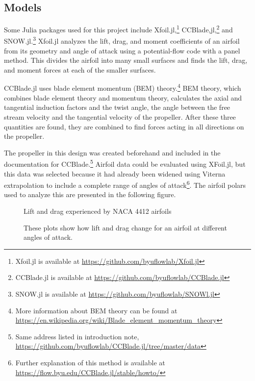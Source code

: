 \documentclass[journal ]{new-aiaa}
\begin{document}
\subsection{Models}

Some Julia packages used for this project include Xfoil.jl,\footnote{Xfoil.jl is available at \url{https://github.com/byuflowlab/Xfoil.jl}} CCBlade,jl,\footnote{CCBlade.jl is available at \url{https://github.com/byuflowlab/CCBlade.jl}} and SNOW.jl.\footnote{SNOW.jl is available at \url{https://github.com/byuflowlab/SNOWl.jl}} Xfoil.jl analyzes the lift, drag, and moment coefficients of an airfoil from its geometry and angle of attack using a potential-flow code with a panel method. This divides the airfoil into many small surfaces and finds the lift, drag, and moment forces at each of the smaller surfaces. 

CCBlade.jl uses blade element momentum (BEM) theory.\footnote{More information about BEM theory can be found at \url{https://en.wikipedia.org/wiki/Blade_element_momentum_theory}} BEM theory, which combines blade element theory and momentum theory, calculates the axial and tangential induction factors and the twist angle, the angle between the free stream velocity and the tangential velocity of the propeller. After these three quantities are found, they are combined to find forces acting in all directions on the propeller\cite{CCBlade}.

The propeller in this design was created beforehand and included in the documentation for CCBlade.\footnote{Same address listed in introduction note, \url{https://github.com/byuflowlab/CCBlade.jl/tree/master/data}} Airfoil data could be evaluated using XFoil.jl, but this data was selected because it had already been widened using Viterna extrapolation to include a complete range of angles of attack\footnote{Further explanation of this method is available at \url{https://flow.byu.edu/CCBlade.jl/stable/howto/}}. The airfoil polars used to analyze this are presented in the following figure. 

\begin{figure}[H]
\centering
	\caption{Lift and drag experienced by NACA 4412 airfoils}
	\captionsetup{aboveskip=0pt,font=it}
	\caption*{These plots show how lift and drag change for an airfoil at different angles of attack.}
	\label{afplot}
\end{figure}
\end{document}

